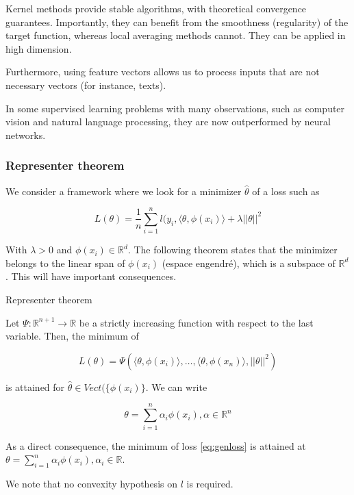 \documentclass[
10pt, %
a4paper, %
oneside, %
headinclude,footinclude, %
BCOR5mm, %
]{scrartcl}
\begin{document}
Kernel methods provide stable algorithms, with theoretical convergence guarantees. Importantly, they can benefit from the smoothness (regularity) of the target function, whereas local averaging methods cannot. They can be applied in high dimension.

Furthermore, using feature vectors allows us to process inputs that are not necessary vectors (for instance, texts).

In some supervised learning problems with many observations, such as computer vision and natural language processing, they are now outperformed by neural networks.

\subsubsection{\large\color{Periwinkle}Representer theorem}

We consider a framework where we look for a minimizer $ \hat{\theta}$ of a loss such as

\begin{equation}
    \label{eq:genloss}
    L( \theta) = \frac{1}{n} \sum^{n}_{i=1} l(y_i, \langle\theta,\phi(x_i)\rangle+\lambda ||\theta||^2
\end{equation}

With $\lambda>0$ and $\phi(x_i)\in \mathbb{R}^d$. The following theorem states that the minimizer belongs to the linear span of $\phi(x_i)$ (espace engendré), which is a subspace of $ \mathbb{R}^d$. This will have important consequences.

\begin{theorem}{Representer theorem}

    Let $\Psi : \mathbb{R}^{n+1}\rightarrow \mathbb{R} $ be a strictly increasing function with respect to the last variable. Then, the minimum of 

    \begin{equation*}
	L(\theta)  =\Psi(\langle\theta,\phi(x_i) \rangle, \dots, \langle\theta, \phi(x_n) \rangle, ||\theta||^2)
    \end{equation*}

    is attained for $ \hat{\theta}\in Vect(\{\phi(x_i)\}$. We can write
    
    \begin{equation*}
	\theta = \sum^{n}_{i=1} \alpha_i\phi(x_i), \alpha\in \mathbb{R}^n
    \end{equation*}
\end{theorem}

\begin{corollary}
    As a direct consequence, the minimum of loss \ref{eq:genloss} is attained at $\theta = \sum^{n}_{i=1} \alpha_i\phi(x_i), \alpha_i\in \mathbb{R}$.

    We note that no convexity hypothesis on $l$ is required.
\end{corollary}
\end{document}
